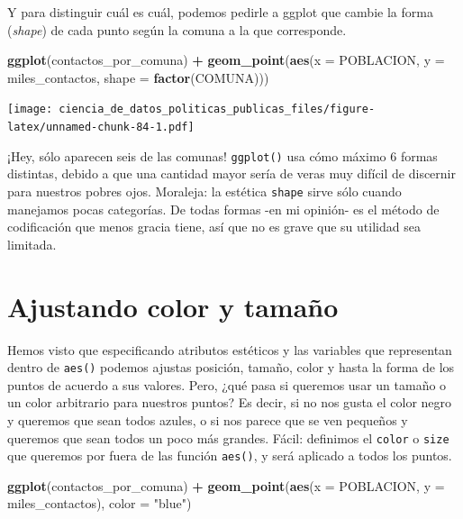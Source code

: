 \documentclass[]{book}
\newenvironment{Shaded}{\begin{snugshade}}{\end{snugshade}}
\newcommand{\KeywordTok}[1]{\textcolor[rgb]{0.13,0.29,0.53}{\textbf{#1}}}
\newcommand{\DataTypeTok}[1]{\textcolor[rgb]{0.13,0.29,0.53}{#1}}
\newcommand{\StringTok}[1]{\textcolor[rgb]{0.31,0.60,0.02}{#1}}
\newcommand{\OperatorTok}[1]{\textcolor[rgb]{0.81,0.36,0.00}{\textbf{#1}}}
\newcommand{\NormalTok}[1]{#1}
\begin{document}
Y para distinguir cuál es cuál, podemos pedirle a ggplot que cambie la
forma (\emph{shape}) de cada punto según la comuna a la que corresponde.

\begin{Shaded}
\begin{Highlighting}[]
\KeywordTok{ggplot}\NormalTok{(contactos_por_comuna) }\OperatorTok{+}\StringTok{ }
\StringTok{    }\KeywordTok{geom_point}\NormalTok{(}\KeywordTok{aes}\NormalTok{(}\DataTypeTok{x =}\NormalTok{ POBLACION, }\DataTypeTok{y =}\NormalTok{ miles_contactos, }\DataTypeTok{shape =} \KeywordTok{factor}\NormalTok{(COMUNA)))}
\end{Highlighting}
\end{Shaded}

\texttt{[image: ciencia\_de\_datos\_politicas\_publicas\_files/figure-latex/unnamed-chunk-84-1.pdf]}

¡Hey, sólo aparecen seis de las comunas! \texttt{ggplot()} usa cómo
máximo 6 formas distintas, debido a que una cantidad mayor sería de
veras muy difícil de discernir para nuestros pobres ojos. Moraleja: la
estética \texttt{shape} sirve sólo cuando manejamos pocas categorías. De
todas formas -en mi opinión- es el método de codificación que menos
gracia tiene, así que no es grave que su utilidad sea limitada.

\section{Ajustando color y tamaño}\label{ajustando-color-y-tamano}

Hemos visto que especificando atributos estéticos y las variables que
representan dentro de \texttt{aes()} podemos ajustas posición, tamaño,
color y hasta la forma de los puntos de acuerdo a sus valores. Pero,
¿qué pasa si queremos usar un tamaño o un color arbitrario para nuestros
puntos? Es decir, si no nos gusta el color negro y queremos que sean
todos azules, o si nos parece que se ven pequeños y queremos que sean
todos un poco más grandes. Fácil: definimos el \texttt{color} o
\texttt{size} que queremos por fuera de las función \texttt{aes()}, y
será aplicado a todos los puntos.

\begin{Shaded}
\begin{Highlighting}[]
\KeywordTok{ggplot}\NormalTok{(contactos_por_comuna) }\OperatorTok{+}\StringTok{ }
\StringTok{    }\KeywordTok{geom_point}\NormalTok{(}\KeywordTok{aes}\NormalTok{(}\DataTypeTok{x =}\NormalTok{ POBLACION, }\DataTypeTok{y =}\NormalTok{ miles_contactos), }\DataTypeTok{color =} \StringTok{"blue"}\NormalTok{)}
\end{Highlighting}
\end{Shaded}
\end{document}
